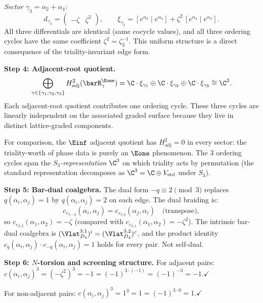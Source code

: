 \begin{computation}[\texorpdfstring{$D_4$}{D_4} at the Coxeter root: \texorpdfstring{$N = 3$}{N = 3}, triality]
\emph{Sector $\gamma_3 = \alpha_2 + \alpha_4$:}
\[
d_{\gamma_3}
= \begin{pmatrix} -\zeta & \zeta^2 \end{pmatrix},
\qquad
\xi_{\gamma_3}
= [e^{\alpha_2} \mid e^{\alpha_4}]
 + \zeta^2\,[e^{\alpha_4} \mid e^{\alpha_2}].
\]
All three differentials are identical (same cocycle values), and all
three ordering cycles have the same coefficient
$\zeta^2 = \zeta_3^{-1}$. This uniform structure is a direct
consequence of the triality-invariant edge form.
\smallskip

\noindent\textbf{Step 4: Adjacent-root quotient.}
\[
\bigoplus_{\gamma \in \{\gamma_1,\gamma_2,\gamma_3\}}
H^2_{\mathrm{adj}}(\barB^{\Eone}_\gamma)
= \C \cdot \xi_{\gamma_1}
 \oplus \C \cdot \xi_{\gamma_2}
 \oplus \C \cdot \xi_{\gamma_3}
\cong \C^3.
\]
Each adjacent-root quotient contributes one ordering cycle. These
three cycles are linearly independent on the associated graded
surface because they live in distinct lattice-graded components.

For comparison, the $\Einf$ adjacent quotient has $H^2_{\mathrm{adj}}=0$
in every sector: the triality-worth of phase data is purely an
$\Eone$ phenomenon. The 3 ordering cycles span the
\emph{$S_3$-representation} $\C^3$ on which triality acts by
permutation (the standard representation decomposes as
$\C^3 = \C \oplus V_{\mathrm{std}}$ under $S_3$).
\smallskip

\noindent\textbf{Step 5: Bar-dual coalgebra.}
The dual form $-q \equiv 2 \pmod{3}$ replaces $q(\alpha_i,\alpha_j) = 1$
by $q(\alpha_i,\alpha_j) = 2$ on each edge. The dual braiding is:
\[
c_{\varepsilon_{3,-q}}(\alpha_i,\alpha_j) = c_{\varepsilon_{3,q}}(\alpha_j,\alpha_i)
\quad\text{(transpose)},
\]
so
$c_{\varepsilon_{3,2}}(\alpha_1,\alpha_2) = -\zeta$
(compared with $c_{\varepsilon_{3,1}}(\alpha_1,\alpha_2) = -\zeta^2$).
The intrinsic bar-dual coalgebra is
$(\Vlat_{D_4}^{3,1})^i = (\Vlat_{D_4}^{3,2})^c$,
and the product identity
$c_q(\alpha_i,\alpha_j) \cdot c_{-q}(\alpha_i,\alpha_j) = 1$
holds for every pair. Not self-dual.
\smallskip

\noindent\textbf{Step 6: $N$-torsion and screening structure.}
For adjacent pairs: $c(\alpha_i,\alpha_j)^3 = (-\zeta^2)^3 = -1
= (-1)^{3 \cdot (-1)} = (-1)^{-3} = -1$.\;$\checkmark$

For non-adjacent pairs: $c(\alpha_i,\alpha_j)^3 = 1^3 = 1
= (-1)^{3 \cdot 0} = 1$.\;$\checkmark$


\end{computation}
